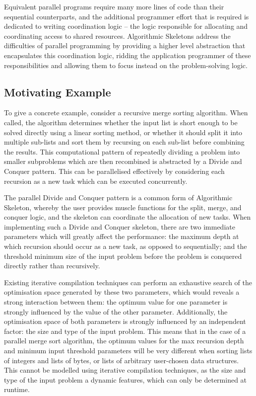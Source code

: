 Equivalent parallel programs require many more lines of code than
their sequential counterparts, and the additional programmer effort
that is required is dedicated to writing coordination logic -- the
logic responsible for allocating and coordinating access to shared
resources. Algorithmic Skeletons address the difficulties of parallel
programming by providing a higher level abstraction that encapsulates
this coordination logic, ridding the application programmer of these
responsibilities and allowing them to focus instead on the
problem-solving logic.

\subsection{Motivating Example}

To give a concrete example, consider a recursive merge sorting
algorithm. When called, the algorithm determines whether the input
list is short enough to be solved directly using a linear sorting
method, or whether it should split it into multiple sub-lists and sort
them by recursing on each sub-list before combining the results. This
computational pattern of repeatedly dividing a problem into smaller
subproblems which are then recombined is abstracted by a Divide and
Conquer pattern. This can be parallelised effectively by considering
each recursion as a new task which can be executed concurrently.

The parallel Divide and Conquer pattern is a common form of
Algorithmic Skeleton, whereby the user provides muscle functions for
the split, merge, and conquer logic, and the skeleton can coordinate
the allocation of new tasks. When implementing such a Divide and
Conquer skeleton, there are two immediate parameters which will
greatly affect the performance: the maximum depth at which recursion
should occur as a new task, as opposed to sequentially; and the
threshold minimum size of the input problem before the problem is
conquered directly rather than recursively.

Existing iterative compilation techniques can perform an exhaustive
search of the optimisation space generated by these two parameters,
which would reveals a strong interaction between them: the optimum
value for one parameter is strongly influenced by the value of the
other parameter. Additionally, the optimisation space of both
parameters is strongly influenced by an independent factor: the size
and type of the input problem. This means that in the case of a
parallel merge sort algorithm, the optimum values for the max
recursion depth and minimum input threshold parameters will be very
different when sorting lists of integers and lists of bytes, or lists
of arbitrary user-chosen data structures. This cannot be modelled
using iterative compilation techniques, as the size and type of the
input problem a dynamic features, which can only be determined at
runtime.

